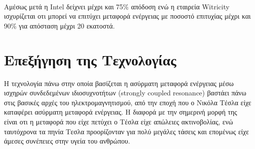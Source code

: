 Αμέσως μετά η Intel\textsuperscript{\textregistered} δείχνει μέχρι και 75\% απόδοση \cite{intel_recharg} ενώ η εταιρεία Witricity\textsuperscript{\textregistered}
ισχυρίζεται οτι μπορεί να επιτύχει μεταφορά ενέργειας με ποσοστό επιτυχίας μέχρι και 90\% \cite{witricity_90} για απόσταση μέχρι 20 εκατοστά.


\section{Επεξήγηση της Τεχνολογίας}
Η τεχνολογία πάνω στην οποία βασίζεται η ασύρματη μεταφορά ενέργειας μέσω ισχηρών συνδεδεμένων ιδιοσυχνοτήτων (strongly coupled resonance) βαστάει πάνω στις βασικές
αρχές του ηλεκτρομαγνητισμού, από την εποχή που ο Νικόλα Τέσλα είχε καταφέρει ασύρματη μεταφορά ενέργειας. Η διαφορά με την σημερινή μορφή της είναι οτι
η μεταφορά που είχε πετύχει ο Τέσλα είχε απώλειες ακτινοβολίας, ενώ ταυτόχρονα τα πηνία Τεσλα προορίζονταν για πολύ μεγάλες τάσεις και επομένως είχε άμεσες συνέπειες
στην υγεία του ανθρώπου.

